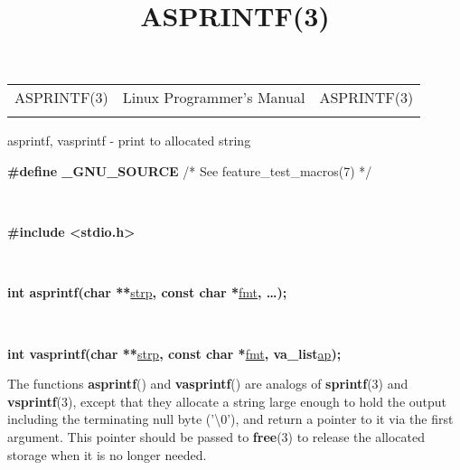 \documentclass[]{article}
\title{ASPRINTF(3)}
\author{}
\date{}
\let\realtextbf=\textbf
\renewcommand{\textbf}[1]{\textcolor{boldcolor}{\realtextbf{#1}}}
\renewcommand{\emph}[1]{\underline{#1}}
\begin{document}
\maketitle

\begin{longtable}[c]{@{}lll@{}}
\toprule\addlinespace
ASPRINTF(3) & Linux Programmer's Manual & ASPRINTF(3)
\\\addlinespace
\bottomrule
\end{longtable}


asprintf, vasprintf - print to allocated string


\textbf{\#define \_GNU\_SOURCE} /* See feature\_test\_macros(7) */

~

\textbf{\#include \textless{}stdio.h\textgreater{}}

~

\textbf{int asprintf(char **}\emph{strp}\textbf{, const char
*}\emph{fmt}\textbf{, \ldots{});}

~

\textbf{int vasprintf(char **}\emph{strp}\textbf{, const char
*}\emph{fmt}\textbf{, va\_list}\emph{ap}\textbf{);}


The functions \textbf{asprintf}() and \textbf{vasprintf}() are analogs
of \textbf{sprintf}(3) and \textbf{vsprintf}(3), except that they
allocate a string large enough to hold the output including the
terminating null byte ('\textbackslash{}0'), and return a pointer to it
via the first argument. This pointer should be passed to
\textbf{free}(3) to release the allocated storage when it is no longer
needed.

\end{document}
